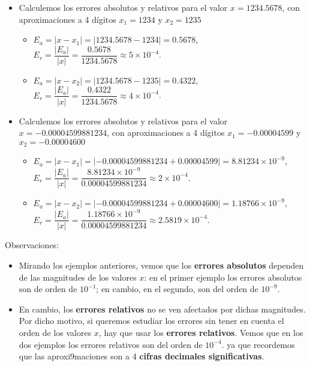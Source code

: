 \documentclass[
]{article}
\providecommand{\tightlist}{%
  \setlength{\itemsep}{0pt}\setlength{\parskip}{0pt}}
\begin{document}
\begin{itemize}
\tightlist
\item
  Calculemos los errores absolutos y relativos para el valor
  \(x= 1234.5678\), con aproximaciones a 4 dígitos \(x_1=1234\) y
  \(x_2=1235\)

  \begin{itemize}
  \tightlist
  \item
    \(E_a = |x - x_1| = |1234.5678 - 1234| = 0.5678\),
    \(E_r = \dfrac{|E_a|}{|x|} = \dfrac{0.5678}{1234.5678} \approx 5 \times 10^{-4}\).
  \item
    \(E_a = |x - x_2| = |1234.5678 - 1235| = 0.4322\),
    \(E_r = \dfrac{|E_a|}{|x|} = \dfrac{0.4322}{1234.5678} \approx 4 \times 10^{-4}\).
  \end{itemize}
\item
  Calculemos los errores absolutos y relativos para el valor
  \(x= −0.00004599881234\), con aproximaciones a 4 dígitos
  \(x_1=-0.00004599\) y \(x_2=-0.00004600\)

  \begin{itemize}
  \tightlist
  \item
    \(E_a = |x - x_1| = |−0.00004599881234 + 0.00004599| = 8.81234 \times 10^{−9}\),
    \(E_r = \dfrac{|E_a|}{|x|} = \dfrac{8.81234×10^{−9}}{0.00004599881234} \approx 2 \times 10^{-4}\).
  \item
    \(E_a = |x - x_2| = |−0.00004599881234 + 0.00004600| = 1.18766 \times 10^{−9}\),
    \(E_r = \dfrac{|E_a|}{|x|} = \dfrac{1.18766 \times 10^{−9}}{0.00004599881234} \approx 2.5819 \times 10^{-4}\).
  \end{itemize}
\end{itemize}

Observaciones:

\begin{itemize}
\item
  Mirando los ejemplos anteriores, vemos que los \textbf{errores
  absolutos} dependen de las magnitudes de los valores \(x\): en el
  primer ejemplo los errores absolutos son de orden de \(10^{−1}\); en
  cambio, en el segundo, son del orden de \(10^{−9}\).
\item
  En cambio, los \textbf{errores relativos} no se ven afectados por
  dichas magnitudes. Por dicho motivo, si queremos estudiar los errores
  sin tener en cuenta el orden de los valores \(x\), hay que usar los
  \textbf{errores relativos}. Vemos que en los dos ejemplos los errores
  relativos son del orden de \(10^{−4}\). ya que recordemos que las
  aproxi9maciones son a 4 \textbf{cifras decimales significativas}.
\end{itemize}
\end{document}
